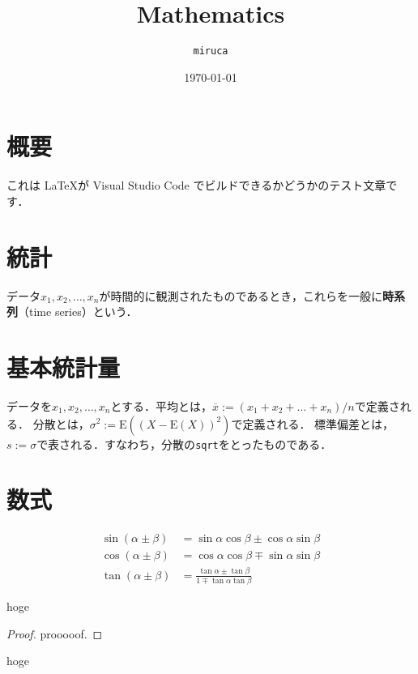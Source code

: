 \documentclass[dvipdfmx,uplatex]{jsarticle}
\begin{document}
\title{Mathematics}
\author{\texttt{miruca}}
\date{\today}
\maketitle

\section{概要}
これは \LaTeX が Visual Studio Code でビルドできるかどうかのテスト文章です．

\section{統計}
データ$x_1,x_2,\dots,x_n$が時間的に観測されたものであるとき，これらを一般に\textbf{時系列}（time series）という．

\section{基本統計量}
データを$x_1,x_2,\dots,x_n$とする．平均とは，$\overline{x}:=(x_1 + x_2 + \dots + x_n)/n$で定義される．
分散とは，$\sigma^2:=\mathrm{E}\left( \left( X - \mathrm{E}(X) \right)^2 \right)$で定義される．
標準偏差とは，$s:=\sigma$で表される．すなわち，分散の\texttt{sqrt}をとったものである．

\section{数式}
\begin{align}
    \sin(\alpha \pm \beta) &= \sin \alpha \cos \beta \pm \cos \alpha \sin \beta \\
    \cos(\alpha \pm \beta) &= \cos \alpha \cos \beta \mp \sin \alpha \sin \beta \\
    \tan(\alpha \pm \beta) &= \frac{\tan \alpha \pm \tan \beta}{1 \mp \tan \alpha \tan \beta}
\end{align}

\begin{defbox}
    \begin{definition}
      hoge
    \end{definition}
\end{defbox}

\begin{proof}
    prooooof.  
\end{proof}
%
\vspace{\baselineskip}
\begin{theorembox}
    \begin{theorem}
      hoge
    \end{theorem}
\end{theorembox}
\end{document}
